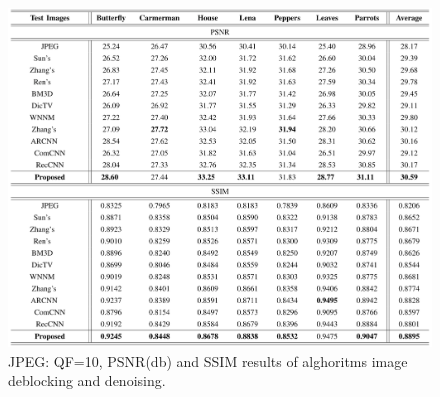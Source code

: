 \begin{figure}[h!]
    \centering
    \includegraphics[width = 1 \linewidth]{images/paper3/comparison2.png}
    \centering
    \caption{JPEG: QF=10, PSNR(db) and SSIM results of alghoritms image deblocking and denoising.}
    \label{fig:QF10}
\end{figure}